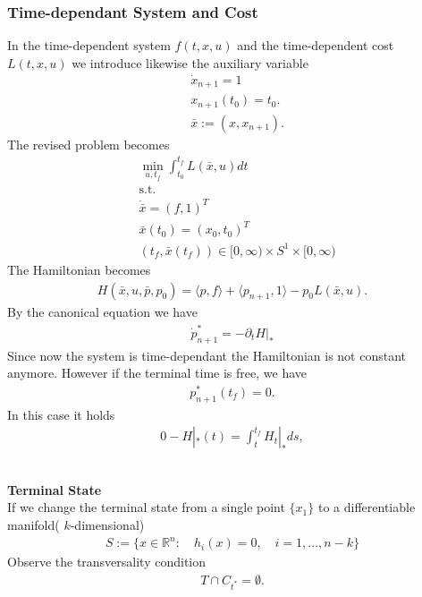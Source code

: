 \subsubsection{Time-dependant System and Cost}
In the time-dependent system $f(t, x, u)$ and the time-dependent cost $L(t, x, u)$ we introduce likewise the auxiliary variable
\begin{align*}
	& \dot{x}_{n +1} = 1\\
	& x_{n + 1}(t_0) = t_0.\\
	& \bar{x}:= (x, x_{n + 1}). 
\end{align*}
The revised problem becomes
\begin{align*}
	&\min_{u, t_f} \int_{t_0}^{t_f} L(\bar{x}, u)dt \\
	& \text{s.t.}\\
	& \dot{\bar{x}} = (f, 1)^T\\
	& \bar{x}(t_0) = (x_0, t_0)^T\\
	& (t_f, \bar{x}(t_f)) \in [0, \infty) \times S^1 \times [0, \infty)
\end{align*}
The Hamiltonian becomes
\begin{align*}
	H(\bar{x}, u, \bar{p}, p_0) = \langle p, f \rangle + \langle p_{n + 1}, 1 \rangle - p_0 L(\bar{x}, u). 
\end{align*}
By the canonical equation we have
\begin{align*}
	\dot{p}_{n +1}^* = - \partial_t H|_*
\end{align*}
Since now the system is time-dependant the Hamiltonian is not constant anymore. However if the terminal time is free, we have
\begin{align*}
	p^*_{n + 1}(t_f) = 0.
\end{align*}
In this case it holds
\begin{align*}
	0 - H|_*(t) = \int_t^{t_f} H_t|_* ds, 
\end{align*}



\quad\\
\textbf{Terminal State}\quad\\
If we change the terminal state from a single point $\{x_1\}$ to a differentiable manifold( $k$-dimensional)
\begin{align*}
	S:= \{x \in \mathbb{R}^n: \quad h_i(x) = 0, \quad i= 1, \dots, n - k\}
\end{align*}
Observe the transversality condition
\begin{align*}
	T \cap C_{t^*} = \emptyset. 
\end{align*} 

